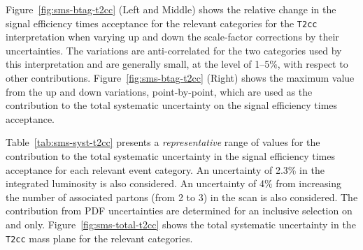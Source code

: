 Figure~\ref{fig:sms-btag-t2cc} (Left and Middle) shows the relative
change in the signal efficiency times acceptance for the relevant
categories for the \verb!T2cc! interpretation when varying up and down
the scale-factor corrections by their uncertainties. The variations
are anti-correlated for the two \nb categories used by this
interpretation and are generally small, at the level of 1--5\%, with
respect to other contributions.  Figure~\ref{fig:sms-btag-t2cc}
(Right) shows the maximum value from the up and down variations,
point-by-point, which are used as the contribution to the total
systematic uncertainty on the signal efficiency times acceptance.

Table~\ref{tab:sms-syst-t2cc} presents a {\it representative} range of
values for the contribution to the total systematic uncertainty in the
signal efficiency times acceptance for each relevant event
category. An uncertainty of 2.3\% in the integrated luminosity is also
considered. An uncertainty of 4\% from increasing the number of
associated partons (from 2 to 3) in the scan is also considered. The
contribution from PDF uncertainties are determined for an inclusive
selection on \njet and \nb only. Figure~\ref{fig:sms-total-t2cc} shows
the total systematic uncertainty in the \verb!T2cc! mass plane for the
relevant categories.

